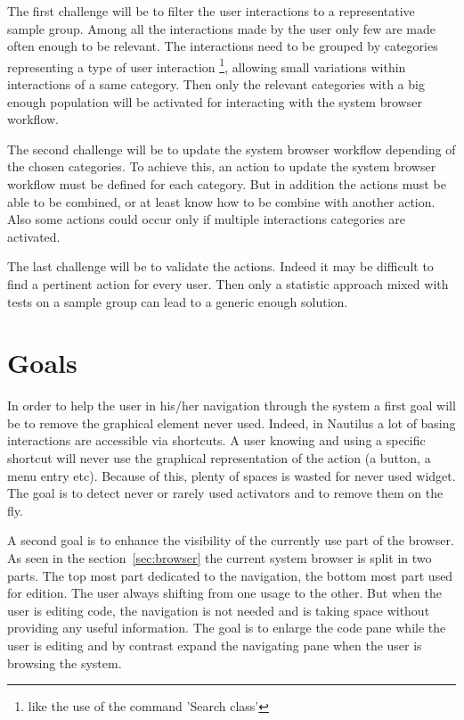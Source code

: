 \documentclass[12pt]{article}
\begin{document}
The first challenge will be to filter the user interactions to a representative sample group. 
Among all the interactions made by the user only few are made often enough to be relevant.
The interactions need to be grouped by categories representing a type of user interaction \footnote{like the use of the command 'Search class'}, allowing small variations within interactions of a same category.
Then only the relevant categories with a big enough population will be activated for interacting with the system browser workflow.

The second challenge will be to update the system browser workflow depending of the chosen categories.
To achieve this, an action to update the system browser workflow must be defined for each category.
But in addition the actions must be able to be combined, or at least know how to be combine with another action.
Also some actions could occur only if multiple interactions categories are activated.

The last challenge will be to validate the actions.
Indeed it may be difficult to find a pertinent action for every user.
Then only a statistic approach mixed with tests on a sample group can lead to a generic enough solution.

\section{Goals}

In order to help the user in his/her navigation through the system a first goal will be to remove the graphical element never used.
Indeed, in Nautilus a lot of basing interactions are accessible via shortcuts.
A user knowing and using a specific shortcut will never use the graphical representation of the action (a button, a menu entry etc).
Because of this, plenty of spaces is wasted for never used widget.
The goal is to detect never or rarely used activators and to remove them on the fly.

A second goal is to enhance the visibility of the currently use part of the browser.
As seen in the section~\ref{sec:browser} the current system browser is split in two parts.
The top most part dedicated to the navigation, the bottom most part used for edition.
The user always shifting from one usage to the other.
But when the user is editing code, the navigation is not needed and is taking space without providing any useful information.
The goal is to enlarge the code pane while the user is editing and by contrast expand the navigating pane when the user is browsing the system.
\end{document}
